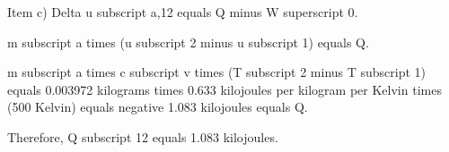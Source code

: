 Item c) Delta u subscript a,12 equals Q minus W superscript 0.

m subscript a times (u subscript 2 minus u subscript 1) equals Q.

m subscript a times c subscript v times (T subscript 2 minus T subscript 1) equals 0.003972 kilograms times 0.633 kilojoules per kilogram per Kelvin times (500 Kelvin) equals negative 1.083 kilojoules equals Q.

Therefore, Q subscript 12 equals 1.083 kilojoules.